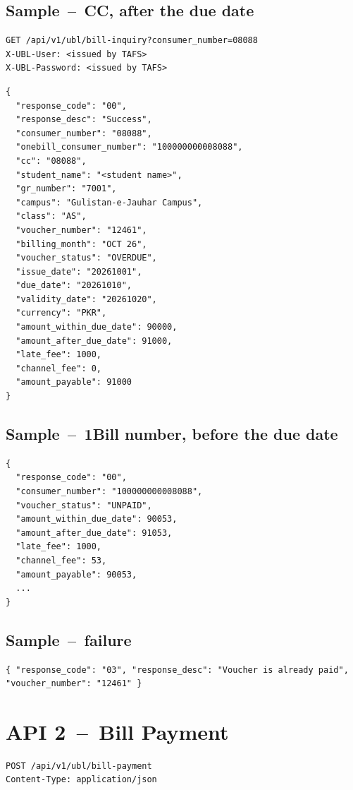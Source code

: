 \documentclass[11pt]{article}
\begin{document}
\subsection{Sample \,--\, CC, after the due date}
\begin{lstlisting}
GET /api/v1/ubl/bill-inquiry?consumer_number=08088
X-UBL-User: <issued by TAFS>
X-UBL-Password: <issued by TAFS>
\end{lstlisting}
\begin{lstlisting}
{
  "response_code": "00",
  "response_desc": "Success",
  "consumer_number": "08088",
  "onebill_consumer_number": "100000000008088",
  "cc": "08088",
  "student_name": "<student name>",
  "gr_number": "7001",
  "campus": "Gulistan-e-Jauhar Campus",
  "class": "AS",
  "voucher_number": "12461",
  "billing_month": "OCT 26",
  "voucher_status": "OVERDUE",
  "issue_date": "20261001",
  "due_date": "20261010",
  "validity_date": "20261020",
  "currency": "PKR",
  "amount_within_due_date": 90000,
  "amount_after_due_date": 91000,
  "late_fee": 1000,
  "channel_fee": 0,
  "amount_payable": 91000
}
\end{lstlisting}

\subsection{Sample \,--\, 1Bill number, before the due date}
\begin{lstlisting}
{
  "response_code": "00",
  "consumer_number": "100000000008088",
  "voucher_status": "UNPAID",
  "amount_within_due_date": 90053,
  "amount_after_due_date": 91053,
  "late_fee": 1000,
  "channel_fee": 53,
  "amount_payable": 90053,
  ...
}
\end{lstlisting}

\subsection{Sample \,--\, failure}
\begin{lstlisting}
{ "response_code": "03", "response_desc": "Voucher is already paid", "voucher_number": "12461" }
\end{lstlisting}

\section{API 2 \,--\, Bill Payment}\label{sec:payment}
\begin{lstlisting}
POST /api/v1/ubl/bill-payment
Content-Type: application/json
\end{lstlisting}
\end{document}
